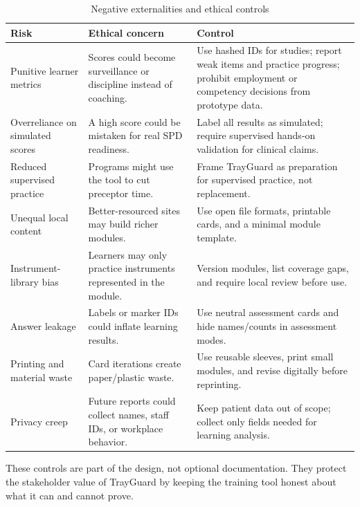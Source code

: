 \documentclass[10pt,a4paper]{article}
\begin{document}
\begin{table}[H]
\centering
\caption{Negative externalities and ethical controls}
\label{tab:negative-externalities-and-ethical-controls}
\small\renewcommand{\arraystretch}{1.2}\setlength{\tabcolsep}{4pt}
\begin{tabularx}{\textwidth}{|>{\raggedright\arraybackslash}X|>{\raggedright\arraybackslash}X|>{\raggedright\arraybackslash}X|}
\hline
Risk & Ethical concern & Control \\
\hline
Punitive learner metrics & Scores could become surveillance or discipline instead of coaching. & Use hashed IDs for studies; report weak items and practice progress; prohibit employment or competency decisions from prototype data. \\
\hline
Overreliance on simulated scores & A high score could be mistaken for real SPD readiness. & Label all results as simulated; require supervised hands-on validation for clinical claims. \\
\hline
Reduced supervised practice & Programs might use the tool to cut preceptor time. & Frame TrayGuard as preparation for supervised practice, not replacement. \\
\hline
Unequal local content & Better-resourced sites may build richer modules. & Use open file formats, printable cards, and a minimal module template. \\
\hline
Instrument-library bias & Learners may only practice instruments represented in the module. & Version modules, list coverage gaps, and require local review before use. \\
\hline
Answer leakage & Labels or marker IDs could inflate learning results. & Use neutral assessment cards and hide names/counts in assessment modes. \\
\hline
Printing and material waste & Card iterations create paper/plastic waste. & Use reusable sleeves, print small modules, and revise digitally before reprinting. \\
\hline
Privacy creep & Future reports could collect names, staff IDs, or workplace behavior. & Keep patient data out of scope; collect only fields needed for learning analysis. \\
\hline
\end{tabularx}
\end{table}
These controls are part of the design, not optional documentation. They protect
the stakeholder value of TrayGuard by keeping the training tool honest about
what it can and cannot prove.
\end{document}
